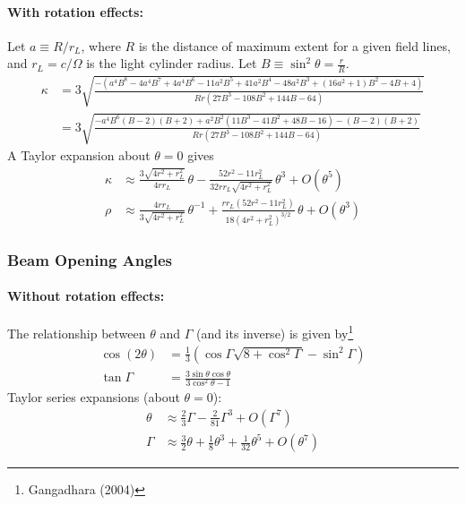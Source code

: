 \documentclass{article}
\begin{document}
\paragraph{With rotation effects:}
Let $a \equiv R/r_L$, where $R$ is the distance of maximum extent for a given field lines, and $r_L = c/\Omega$ is the light cylinder radius.
Let $B \equiv \sin^2\theta = \frac{r}{R}$.
\begin{equation}
    \begin{aligned}
        \kappa &= 3\sqrt{
            \frac{-(a^4B^8 - 4a^4B^7 + 4a^4B^6 -
                   11a^2B^5 + 41a^2B^4 - 48a^2B^3 +
                   (16a^2+1)B^2 - 4B + 4)}{
                       Rr(27B^3 - 108B^2 + 144B - 64)}} \\
           &= 3\sqrt{
               \frac{-a^4B^6(B-2)(B+2) +
                   a^2B^2(11B^3 - 41B^2 + 48B - 16) -
                   (B-2)(B+2)}{
                       Rr(27B^3 - 108B^2 + 144B - 64)}}
    \end{aligned}
\end{equation}
A Taylor expansion about $\theta = 0$ gives
\begin{equation}
    \begin{aligned}
            \kappa &\approx \frac{3\sqrt{4r^2+r_L^2}}{4rr_L}\,\theta -
                            \frac{52r^2 - 11r_L^2}{32rr_L\sqrt{4r^2+r_L^2}}\,\theta^3 +
                            O(\theta^5) \\
            \rho &\approx \frac{4rr_L}{3\sqrt{4r^2+r_L^2}}\,\theta^{-1} +
                          \frac{rr_L(52r^2 - 11r_L^2)}{18(4r^2+r_L^2)^{3/2}}\,\theta +
                          O(\theta^3)
    \end{aligned}
\end{equation}

\subsubsection{Beam Opening Angles}
\label{sec:beamopeningangles}

\paragraph{Without rotation effects:}
The relationship between $\theta$ and $\Gamma$ (and its inverse) is given by\footnote{Gangadhara (2004)}
\begin{equation}
    \begin{aligned}
        \cos(2\theta) &= \frac13\left(\cos\Gamma\sqrt{8 + \cos^2\Gamma} - \sin^2\Gamma\right) \\
        \tan\Gamma &= \frac{3\sin\theta\cos\theta}{3\cos^2\theta - 1}
    \end{aligned}
\end{equation}
Taylor series expansions (about $\theta = 0$):
\begin{equation}
    \begin{aligned}
        \theta &\approx \frac23 \Gamma - \frac2{81} \Gamma^3 + O(\Gamma^7) \\
        \Gamma &\approx \frac32 \theta + \frac18 \theta^3 + \frac1{32} \theta^5 + O(\theta^7)
    \end{aligned}
\end{equation}
\end{document}
